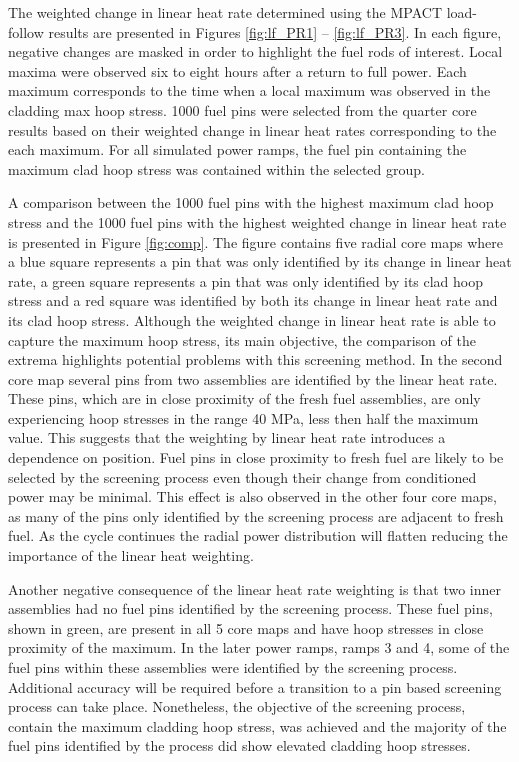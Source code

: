 \documentclass[edeposit,fullpage,11pt]{uiucthesis2009}
\begin{document}
The weighted change in linear heat rate determined using the MPACT load-follow results are presented in Figures \ref{fig:lf_PR1} -- \ref{fig:lf_PR3}.
In each figure, negative changes are masked in order to highlight the fuel rods of interest.
Local maxima were observed six to eight hours after a return to full power.
Each maximum corresponds to the time when a local maximum was observed in the cladding max hoop stress.
1000 fuel pins were selected from the quarter core results based on their weighted change in linear heat rates corresponding to the each maximum.
For all simulated power ramps, the fuel pin containing the maximum clad hoop stress was contained within the selected group.
 
A comparison between the 1000 fuel pins with the highest maximum clad hoop stress and the 1000 fuel pins with the highest weighted change in linear heat rate is presented in Figure \ref{fig:comp}.
The figure contains five radial core maps where a blue square represents a pin that was only identified by its change in linear heat rate, a green square represents a pin that was only identified by its clad hoop stress and a red square was identified by both its change in linear heat rate and its clad hoop stress.
Although the weighted change in linear heat rate is able to capture the maximum hoop stress, its main objective, the comparison of the extrema highlights potential problems with this screening method.
In the second core map several pins from two assemblies are identified by the linear heat rate.
These pins, which are in close proximity of the fresh fuel assemblies, are only experiencing hoop stresses in the range 40 MPa, less then half the maximum value.
This suggests that the weighting by linear heat rate introduces a dependence on position.
Fuel pins in close proximity to fresh fuel are likely to be selected by the screening process even though their change from conditioned power may be minimal.
This effect is also observed in the other four core maps, as many of the pins only identified by the screening process are adjacent to fresh fuel.
As the cycle continues the radial power distribution will flatten reducing the importance of the linear heat weighting.

Another negative consequence of the linear heat rate weighting is that two inner assemblies had no fuel pins identified by the screening process.
These fuel pins, shown in green, are present in all 5 core maps and have hoop stresses in close proximity of the maximum.
In the later power ramps, ramps 3 and 4, some of the fuel pins within these assemblies were identified by the screening process.
Additional accuracy will be required before a transition to a pin based screening process can take place.
Nonetheless, the objective of the screening process, contain the maximum cladding hoop stress, was achieved and the majority of the fuel pins identified by the process did show elevated cladding hoop stresses.
\end{document}
